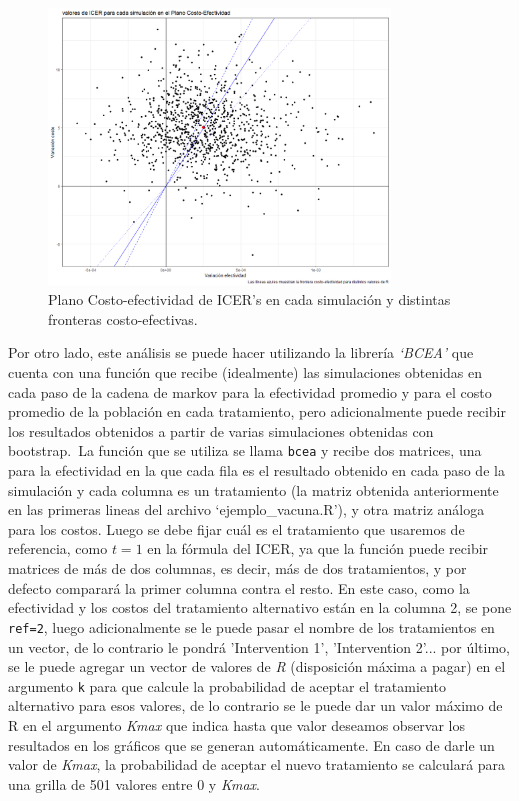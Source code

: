 \documentclass[12pt]{article}
\begin{document}
\begin{figure}[H]
    \centering
    \includegraphics[width=0.81\textwidth]{grafi/plano_icer_simulaciones.jpg}
    \caption{Plano Costo-efectividad de ICER's en cada simulación y distintas fronteras costo-efectivas.}
    \label{fig:61}
\end{figure}

Por otro lado, este análisis se puede hacer utilizando la librería \textit{`BCEA'} que cuenta con una función que recibe (idealmente) las simulaciones obtenidas en cada paso de la cadena de markov para la efectividad promedio y para el costo promedio de la población en cada tratamiento, pero adicionalmente puede recibir los resultados obtenidos a partir de varias simulaciones obtenidas con bootstrap.\
La función que se utiliza se llama \texttt{bcea} y recibe dos matrices, una para la efectividad en la que cada fila es el resultado obtenido en cada paso de la simulación y cada columna es un tratamiento (la matriz obtenida anteriormente en las primeras lineas del archivo `ejemplo\_vacuna.R'), y otra matriz análoga para los costos. Luego se debe fijar cuál es el tratamiento que usaremos de referencia, como $t=1$ en la fórmula del ICER, ya que la función puede recibir matrices de más de dos columnas, es decir, más de dos tratamientos, y por defecto comparará la primer columna contra el resto. En este caso, como la efectividad y los costos del tratamiento alternativo están en la columna 2, se pone \texttt{ref=2}, luego adicionalmente se le puede pasar el nombre de los tratamientos en un vector, de lo contrario le pondrá 'Intervention 1', 'Intervention 2'... por último, se le puede agregar un vector de valores de \textit{R} (disposición máxima a pagar) en el argumento \texttt{k} para que calcule la probabilidad de aceptar el tratamiento alternativo para esos valores, de lo contrario se le puede dar un valor máximo de R en el argumento \textit{Kmax} que indica hasta que valor deseamos observar los resultados en los gráficos que se generan automáticamente. En caso de darle un valor de \textit{Kmax}, la probabilidad de aceptar el nuevo tratamiento se calculará para una grilla de 501 valores entre 0 y \textit{Kmax}.\
\end{document}
